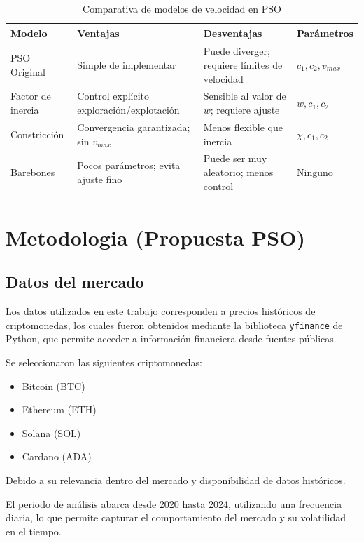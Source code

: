 \documentclass[12pt]{article}
\begin{document}
\begin{table}[H]
  \centering
  \caption{Comparativa de modelos de velocidad en PSO}
  \label{tab:modelos-velocidad}
  \begin{tabularx}{\textwidth}{lXXl}
    \toprule
    \textbf{Modelo} & \textbf{Ventajas} & \textbf{Desventajas} &
    \textbf{Parámetros} \\
    \midrule
    PSO Original &
    Simple de implementar &
    Puede diverger; requiere límites de velocidad &
    $c_1, c_2, v_{max}$ \\
    \addlinespace
    Factor de inercia &
    Control explícito exploración/explotación &
    Sensible al valor de $w$; requiere ajuste &
    $w, c_1, c_2$ \\
    \addlinespace
    Constricción &
    Convergencia garantizada; sin $v_{max}$ &
    Menos flexible que inercia &
    $\chi, c_1, c_2$ \\
    \addlinespace
    Barebones &
    Pocos parámetros; evita ajuste fino &
    Puede ser muy aleatorio; menos control &
    Ninguno \\
    \bottomrule
  \end{tabularx}
\end{table}
 \section{Metodologia (Propuesta PSO)}
\subsection{Datos del mercado}

Los datos utilizados en este trabajo corresponden a precios
históricos de criptomonedas, los cuales fueron obtenidos mediante la
biblioteca \texttt{yfinance} de Python, que permite acceder a
información financiera desde fuentes públicas.

Se seleccionaron las siguientes criptomonedas:
\begin{itemize}
  \item Bitcoin (BTC)
  \item Ethereum (ETH)
  \item Solana (SOL)
  \item Cardano (ADA)
\end{itemize}

Debido a su relevancia dentro del mercado y
disponibilidad de datos históricos.

El periodo de análisis abarca desde 2020 hasta 2024, utilizando una
frecuencia diaria, lo que permite capturar el
comportamiento del mercado y su volatilidad en el tiempo.
\end{document}
